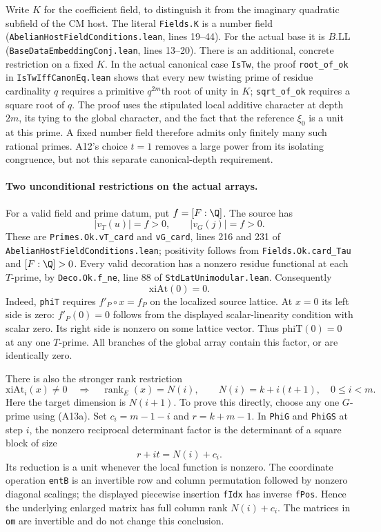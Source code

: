 Write $K$ for the coefficient field, to distinguish it from the
imaginary quadratic subfield of the CM host.  The literal
\texttt{Fields.K} is a number field
(\texttt{AbelianHostFieldConditions.lean}, lines 19--44).
For the actual base it is $B.\mathrm{LL}$
(\texttt{BaseDataEmbeddingConj.lean}, lines 13--20).
There is an additional, concrete restriction on a fixed $K$.
In the actual canonical case \texttt{IsTw}, the proof
\texttt{root\_of\_ok} in \texttt{IsTwIffCanonEq.lean}
shows that every new twisting prime of residue cardinality $q$
requires a primitive $q^{2m}$th root of unity in $K$;
\texttt{sqrt\_of\_ok} requires a square root of $q$.
The proof uses the stipulated local additive character at depth
$2m$, its tying to the global character, and the fact that the
reference $\xi_0$ is a unit at this prime.  A fixed number field
therefore admits only finitely many such rational primes.
A12's choice $t=1$ removes a large power from its isolating
congruence, but not this separate canonical-depth requirement.

\paragraph{Two unconditional restrictions on the actual arrays.}
For a valid field and prime datum, put $f=[F:\Q]$.
The source has
\[
        |v_T(u)|=f>0,\qquad |v_G(j)|=f>0.
        \tag{A13a}
\]
These are \texttt{Primes.Ok.vT\_card} and
\texttt{vG\_card}, lines 216 and 231 of
\texttt{AbelianHostFieldConditions.lean}; positivity follows
from \texttt{Fields.Ok.card\_Tau} and $[F:\Q]>0$.
Every valid decoration has a nonzero residue functional at
each $T$-prime, by \texttt{Deco.Ok.f\_ne}, line 88 of
\texttt{StdLatUnimodular.lean}.
Consequently
\[
                         \mathrm{xiAt}(0)=0.
                         \tag{A13b}
\]
Indeed, \texttt{phiT} requires $f'_P\circ x=f_P$ on the
localized source lattice.  At $x=0$ its left side is zero:
$f'_P(0)=0$ follows from the displayed scalar-linearity
condition with scalar zero.  Its right side is nonzero on
some lattice vector.  Thus $\mathrm{phiT}(0)=0$ at any one
$T$-prime.  All branches of the global array contain this
factor, or are identically zero.

There is also the stronger rank restriction
\[
 \mathrm{xiAt}_i(x)\ne0
           \quad\Longrightarrow\quad
             \operatorname{rank}_E(x)=N(i),
       \qquad N(i)=k+i(t+1),\quad 0\leq i<m.
 \tag{A13c}
\]
Here the target dimension is $N(i+1)$.
To prove this directly, choose any one $G$-prime using
(A13a).  Set $c_i=m-1-i$ and $r=k+m-1$.
In \texttt{PhiG} and \texttt{PhiGS} at step $i$,
the nonzero reciprocal determinant factor is the determinant
of a square block of size
\[
               r+it=N(i)+c_i.
\]
Its reduction is a unit whenever the local function is nonzero.
The coordinate operation \texttt{entB} is an invertible row
and column permutation followed by nonzero diagonal scalings;
the displayed piecewise insertion \texttt{fIdx} has inverse
\texttt{fPos}.  Hence the underlying enlarged matrix has full
column rank $N(i)+c_i$.  The matrices in \texttt{om} are
invertible and do not change this conclusion.

